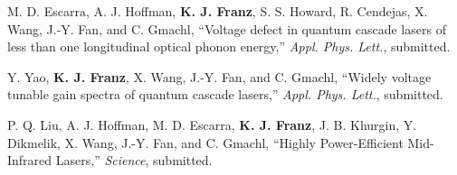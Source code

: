 \begin{list}{}{
  \setlength{\leftmargin}{0.25in}
  \setlength{\rightmargin}{0.25in}
  \setlength{\itemsep}{6pt}
}
\item M. D. Escarra, A. J. Hoffman, \textbf{K. J. Franz}, S. S. Howard, R. Cendejas, X. Wang, J.-Y. Fan, and C. Gmachl, ``Voltage defect in quantum cascade lasers of less than one longitudinal optical phonon energy,'' \emph{Appl. Phys. Lett.}, submitted.
\item Y. Yao, \textbf{K. J. Franz}, X. Wang, J.-Y. Fan, and C. Gmachl, ``Widely voltage tunable gain spectra of quantum cascade lasers,'' \emph{Appl. Phys. Lett.}, submitted.
\item P. Q. Liu, A. J. Hoffman, M. D. Escarra, \textbf{K. J. Franz}, J. B. Khurgin, Y. Dikmelik, X. Wang, J.-Y. Fan, and C. Gmachl, ``Highly Power-Efficient Mid-Infrared Lasers,'' \emph{Science}, submitted.
\end{list}



% 